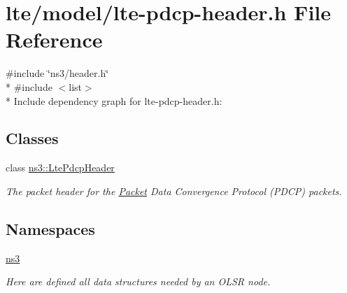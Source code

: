 \hypertarget{lte-pdcp-header_8h}{}\section{lte/model/lte-\/pdcp-\/header.h File Reference}
\label{lte-pdcp-header_8h}
{\ttfamily \#include \char`\"{}ns3/header.\+h\char`\"{}}\\*
{\ttfamily \#include $<$list$>$}\\*
Include dependency graph for lte-\/pdcp-\/header.h\+:
\subsection*{Classes}
\begin{DoxyCompactItemize}
\item 
class \hyperlink{classns3_1_1LtePdcpHeader}{ns3\+::\+Lte\+Pdcp\+Header}
\begin{DoxyCompactList}\small\item\em The packet header for the \hyperlink{classns3_1_1Packet}{Packet} Data Convergence Protocol (P\+D\+CP) packets. \end{DoxyCompactList}\end{DoxyCompactItemize}
\subsection*{Namespaces}
\begin{DoxyCompactItemize}
\item 
 \hyperlink{namespacens3}{ns3}
\begin{DoxyCompactList}\small\item\em Here are defined all data structures needed by an O\+L\+SR node. \end{DoxyCompactList}\end{DoxyCompactItemize}
